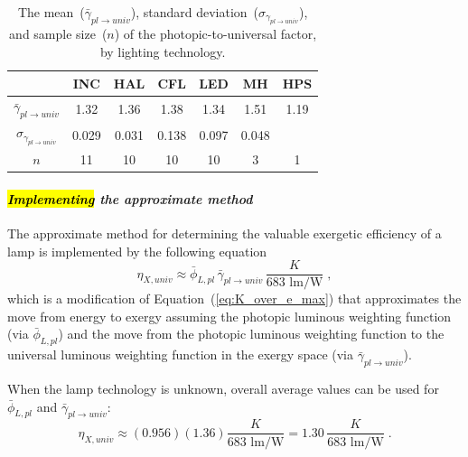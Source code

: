 \documentclass[energies,article,accept,moreauthors,pdftex]{Definitions/mdpi}\usepackage[]{graphicx}\usepackage[]{color}
\newcommand{\gammarat}{\gamma_{pl\rightarrow{}univ}}
\newcommand{\gammaratavg}{\bar{\gamma}_{pl\rightarrow{}univ}}
\providecommand{\DIFaddend}{} %
\providecommand{\DIFaddendFL}{} %
\providecommand{\DIFdelbeginFL}{} %
\newcommand{\DIFscaledelfig}{0.5}
\newlength{\DIFdelgraphicswidth} %
\newlength{\DIFdelgraphicsheight} %
\newcommand{\DIFdelincludegraphics}[2][]{%
\sbox{\DIFdelgraphicsbox}{\DIFOincludegraphics[#1]{#2}}%
\settoboxwidth{\DIFdelgraphicswidth}{\DIFdelgraphicsbox} %
\settoboxtotalheight{\DIFdelgraphicsheight}{\DIFdelgraphicsbox} %
\scalebox{\DIFscaledelfig}{%
\parbox[b]{\DIFdelgraphicswidth}{\usebox{\DIFdelgraphicsbox}\\[-\baselineskip] \rule{\DIFdelgraphicswidth}{0em}}\llap{\resizebox{\DIFdelgraphicswidth}{\DIFdelgraphicsheight}{%
\setlength{\unitlength}{\DIFdelgraphicswidth}%
\begin{picture}(1,1)%
\thicklines\linethickness{2pt} %
{\color[rgb]{1,0,0}\put(0,0){\framebox(1,1){}}}%
{\color[rgb]{1,0,0}\put(0,0){\line( 1,1){1}}}%
{\color[rgb]{1,0,0}\put(0,1){\line(1,-1){1}}}%
\end{picture}%
}\hspace*{3pt}}} %
} %
\DeclareRobustCommand{\DIFaddend}{\DIFOaddend \let\includegraphics\DIFOincludegraphics} %
\DeclareRobustCommand{\DIFaddendFL}{\DIFOaddendFL \let\includegraphics\DIFOincludegraphics} %
\DeclareRobustCommand{\DIFdelbeginFL}{\DIFOdelbeginFL \let\includegraphics\DIFdelincludegraphics} %
\begin{document}
\begin{table}[H]
\centering
\caption{The mean~($\bar{\gamma}_{pl\rightarrow{}univ}$),
                     standard deviation~($\sigma_{\gamma_{pl\rightarrow{}univ}}$), and 
                     sample size~($n$)
                     of the photopic-to-universal factor,
                     by lighting technology.} 
\label{tab:conversionfactors}
\begingroup\footnotesize
\begin{tabular}{ccccccc}
  \toprule
 & \textbf{INC} & \textbf{HAL} & \textbf{CFL} & \textbf{LED} & \textbf{MH} & \textbf{HPS} \\ 
  \midrule
\DIFaddendFL $\gammaratavg{}$ \DIFdelbeginFL & 1.32 & 1.36 & {1.38 }& 1.34 & 1.51 & 1.19 \\ 
  {$\sigma_{\gammarat}$ }&0.029 & {0.031 }& {0.138 }& {0.097 }& {0.048 }&  \\ 
  {$n$ }&{11 }& {10 }& {10 }& {10 }& {3 }& {1 }\\ 
   \bottomrule
\end{tabular}
\endgroup
\end{table}
\DIFaddend 



\paragraph{\emph{\hl{Implementing} the approximate method}}

The approximate method for determining the valuable exergetic efficiency of a lamp
is implemented by the following equation
\begin{equation} \label{eq:approximate}
  \eta_{X,univ} \approx \bar{\phi}_{L,pl} \, \gammaratavg{} \, \frac{K}{683 \text{ lm/W}} \; ,
\end{equation}
%
which is a modification of Equation~(\ref{eq:K_over_e_max})
that approximates the move from energy to exergy
assuming the photopic luminous weighting function (via $\bar{\phi}_{L,pl}$)
and the move from the photopic luminous weighting function to the universal luminous weighting function
in the exergy space (via $\gammaratavg{}$).

When the lamp technology is unknown, overall average values can be used
for $\bar{\phi}_{L,pl}$ and $\gammaratavg{}$:
\begin{equation} \label{eq:approximate_unknown_tech}
  \eta_{X,univ} \approx (0.956) 
                        (1.36)
                        \frac{K}{683 \text{ lm/W}} 
                      = 1.30 \,
                        \frac{K}{683 \text{ lm/W}} \; .
\end{equation}
\end{document}
